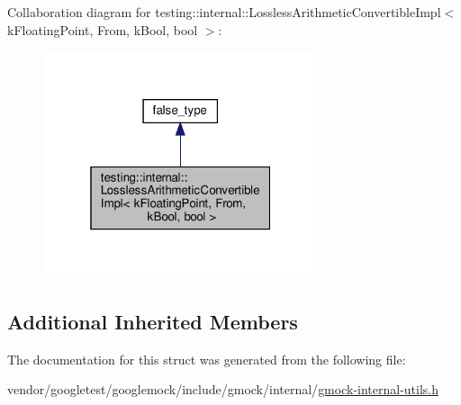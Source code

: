 Collaboration diagram for testing\+:\+:internal\+:\+:Lossless\+Arithmetic\+Convertible\+Impl$<$ k\+Floating\+Point, From, k\+Bool, bool $>$\+:
\nopagebreak
\begin{figure}[H]
\begin{center}
\leavevmode
\includegraphics[width=229pt]{structtesting_1_1internal_1_1_lossless_arithmetic_convertible_impl_3_01k_floating_point_00_01_fr47e600a9a6a1d0efa429d0f6c92fd5b2}
\end{center}
\end{figure}
\subsection*{Additional Inherited Members}


The documentation for this struct was generated from the following file\+:\begin{DoxyCompactItemize}
\item 
vendor/googletest/googlemock/include/gmock/internal/\hyperlink{gmock-internal-utils_8h}{gmock-\/internal-\/utils.\+h}\end{DoxyCompactItemize}
